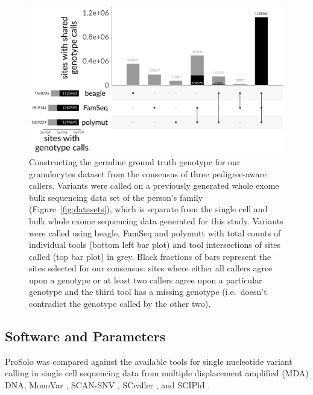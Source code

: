 \documentclass[authoryear,preprint,11pt]{scrartcl}
\begin{document}
\begin{figure}[!tpb]
  \includegraphics[width=\linewidth]{figs/Laehnemann2017/ground_truth/Hoell2014_pedigree_consensus_calling.pdf}
 \caption{
   Constructing the germline ground truth genotype for our granulocytes dataset from the consensus of three pedigree-aware callers.
   Variants were called on a previously generated whole exome bulk sequencing data set of the person's family (Figure~\ref{fig:datasets}), which is separate from the single cell and bulk whole exome sequencing data generated for this study.
   Variants were called using beagle, FamSeq and polymutt with total counts of individual tools (bottom left bar plot) and tool intersections of sites called (top bar plot) in grey.
   Black fractions of bars represent the sites selected for our consensus: sites where either all callers agree upon a genotype or at least two callers agree upon a particular genotype and the third tool has a missing genotype (i.e.~doesn't contradict the genotype called by the other two).
 }
\label{fig:granulocytes-ground-truth}
\end{figure}

\subsection{Software and Parameters}

ProSolo was compared against the available tools for single nucleotide variant calling in single cell sequencing data from multiple displacement amplified (MDA) DNA, MonoVar \citep{zafar_monovar:_2016}, SCAN-SNV \citep{luquette_identification_2019}, SCcaller \citep{dong_accurate_2017}, and SCIPhI \citep{singer_single-cell_2018}.\\
\end{document}
